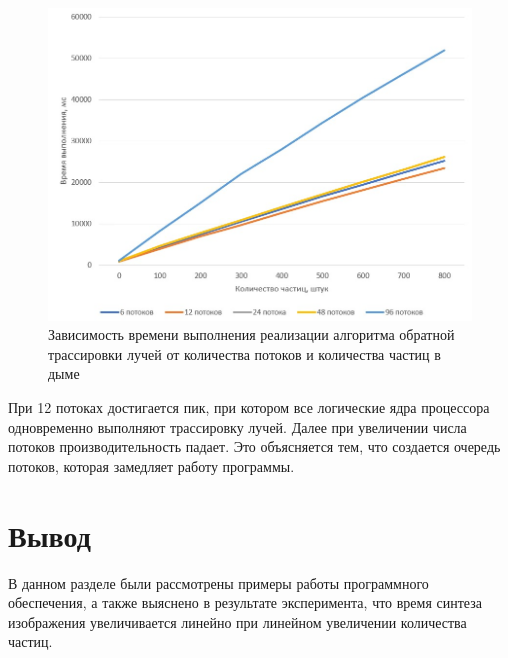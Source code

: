 \captionsetup{justification=centering,singlelinecheck=false}
\begin{figure}[H]
	\centering
	\includegraphics[width=0.9\linewidth]{inc/img/comp_fig}
	\caption{Зависимость времени выполнения реализации алгоритма обратной трассировки лучей от количества потоков и количества частиц в дыме}
	\label{fig:compfig}
\end{figure}

При 12 потоках достигается пик, при котором все логические ядра процессора одновременно выполняют трассировку лучей. Далее при увеличении числа потоков производительность падает. Это объясняется тем, что создается очередь потоков, которая замедляет работу программы.

\section*{Вывод}

В данном разделе были рассмотрены примеры работы программного обеспечения, а также выяснено в результате эксперимента, что время синтеза изображения увеличивается линейно при линейном увеличении количества частиц.

